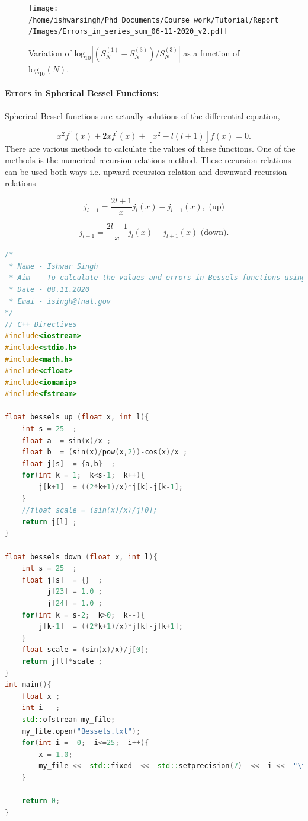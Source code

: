 \documentclass[a4,12pt]{article}
\numberwithin{equation}{subsection}
\begin{document}
\begin{figure}[h]
    \centering
    \texttt{[image: /home/ishwarsingh/Phd\_Documents/Course\_work/Tutorial/Report/Images/Errors\_in\_series\_sum\_06-11-2020\_v2.pdf]}
  \caption{Variation of $\text{log}_{10}|(S^{(1)}_N-S^{(3)}_N)/S^{(3)}_N|$ as a function of $\text{log}_{10}(N)$.}
  \label{series_sum}
\end{figure}
\pagebreak
\paragraph{Errors in Spherical Bessel Functions: } Spherical Bessel functions are actually solutions of the differential equation,

\begin{equation}
  x^2 f^{\prime\prime}(x)+ 2x f^{\prime}(x)+[x^2-l(l+1)]f(x)=0.
\end{equation}
There are various methods to calculate the values of these functions. One of the methods is the numerical recursion relations method. These recursion relations can be used both ways i.e. upward recursion relation and downward recursion relations

\begin{equation}
  j_{l+1} = \frac{2l+1}{x}j_l(x) - j_{l-1}(x), \text{ (up)}
\end{equation}

\begin{equation}
  j_{l-1} = \frac{2l+1}{x}j_l(x) - j_{l+1}(x) \text{ (down).}
\end{equation}

\begin{lstlisting}[language=C++, caption= C++ code to calculate the Bessel functions using upward and downward recursion relations and the associated errors., label= list2]
/*
 * Name - Ishwar Singh
 * Aim  - To calculate the values and errors in Bessels functions using recursion relations.
 * Date - 08.11.2020
 * Emai - isingh@fnal.gov
*/
// C++ Directives
#include<iostream>
#include<stdio.h>
#include<math.h>
#include<cfloat>
#include<iomanip>
#include<fstream>

float bessels_up (float x, int l){
    int s = 25  ;
    float a  = sin(x)/x ;
    float b  = (sin(x)/pow(x,2))-cos(x)/x ;
    float j[s]  = {a,b}  ;
    for(int k = 1;  k<s-1;  k++){
        j[k+1]  = ((2*k+1)/x)*j[k]-j[k-1];
    }
    //float scale = (sin(x)/x)/j[0]; 
    return j[l] ;
}

float bessels_down (float x, int l){
    int s = 25  ;
    float j[s]  = {}  ;
          j[23] = 1.0 ;
          j[24] = 1.0 ;
    for(int k = s-2;  k>0;  k--){
        j[k-1]  = ((2*k+1)/x)*j[k]-j[k+1];
    }
    float scale = (sin(x)/x)/j[0]; 
    return j[l]*scale ;
}
int main(){
    float x ;
    int i   ;
    std::ofstream my_file;
    my_file.open("Bessels.txt");
    for(int i =  0;  i<=25;  i++){
        x = 1.0;
        my_file <<  std::fixed  <<  std::setprecision(7)  <<  i <<  "\t"  <<  bessels_up(x,i) <<  "\t"  <<  bessels_down(x,i) <<  "\t"  << abs(bessels_up(x,i)-bessels_down(x,i))/(abs(bessels_up(x,i))+abs(bessels_down(x,i))) <<    std::endl;
    }

    return 0;
}
\end{lstlisting}



%
\end{document}
